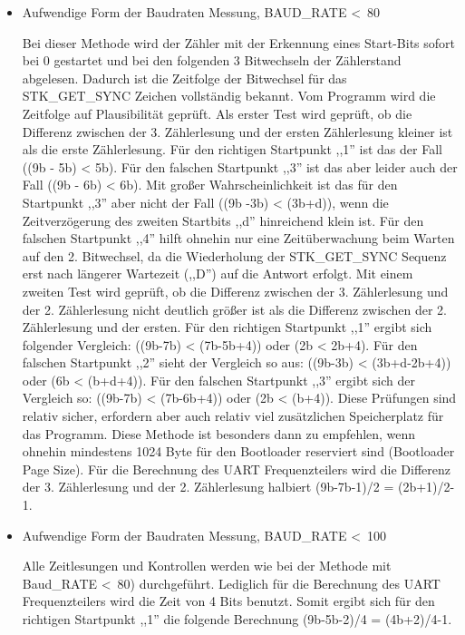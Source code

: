 \begin{itemize}
\item {Aufwendige Form der Baudraten Messung, BAUD\_RATE \textless~80}

Bei dieser Methode wird der Zähler mit der Erkennung eines Start-Bits
sofort bei 0 gestartet und bei den folgenden 3 Bitwechseln der Zählerstand
abgelesen. Dadurch ist die Zeitfolge der Bitwechsel für das STK\_GET\_SYNC
Zeichen vollständig bekannt.
Vom Programm wird die Zeitfolge auf Plausibilität geprüft.
Als erster Test wird geprüft, ob die Differenz zwischen der 3. Zählerlesung
und der ersten Zählerlesung kleiner ist als die erste Zählerlesung.
Für den richtigen Startpunkt ,,1'' ist das der Fall ((9b - 5b) < 5b).
Für den falschen Startpunkt ,,3'' ist das aber leider auch der Fall
((9b - 6b) < 6b). 
Mit großer Wahrscheinlichkeit ist das für den Startpunkt ,,3'' aber nicht der
Fall ((9b -3b) < (3b+d)), wenn die Zeitverzögerung des zweiten Startbits ,,d''
hinreichend klein ist. 
Für den falschen Startpunkt ,,4'' hilft ohnehin nur eine Zeitüberwachung beim
Warten auf den 2. Bitwechsel, da die Wiederholung der STK\_GET\_SYNC Sequenz
erst nach längerer Wartezeit (,,D'') auf die Antwort erfolgt.
Mit einem zweiten Test wird geprüft, ob die Differenz zwischen der 3.
Zählerlesung und der 2. Zählerlesung nicht deutlich größer ist als
die Differenz zwischen der 2. Zählerlesung und der ersten.
Für den richtigen Startpunkt ,,1'' ergibt sich folgender Vergleich:
((9b-7b) < (7b-5b+4)) oder (2b < 2b+4).
Für den falschen Startpunkt ,,2'' sieht der Vergleich so aus:
((9b-3b) < (3b+d-2b+4)) oder (6b < (b+d+4)).
Für den falschen Startpunkt ,,3'' ergibt sich der Vergleich so:
((9b-7b) < (7b-6b+4)) oder (2b < (b+4)).
Diese Prüfungen sind relativ sicher, erfordern aber auch relativ viel
zusätzlichen Speicherplatz für das Programm. Diese Methode ist
besonders dann zu empfehlen, wenn ohnehin mindestens 1024 Byte für den Bootloader
reserviert sind (Bootloader Page Size).
Für die Berechnung des UART Frequenzteilers wird die Differenz der
3. Zählerlesung und der 2. Zählerlesung halbiert (9b-7b-1)/2 = (2b+1)/2-1.

\item {Aufwendige Form der Baudraten Messung, BAUD\_RATE \textless~100}

Alle Zeitlesungen und Kontrollen werden wie bei der Methode mit
Baud\_RATE \textless~80) durchgeführt. Lediglich für die Berechnung
des UART Frequenzteilers wird die Zeit von 4 Bits benutzt.
Somit ergibt sich für den richtigen Startpunkt ,,1'' die folgende
Berechnung (9b-5b-2)/4 = (4b+2)/4-1.

\end{itemize}

